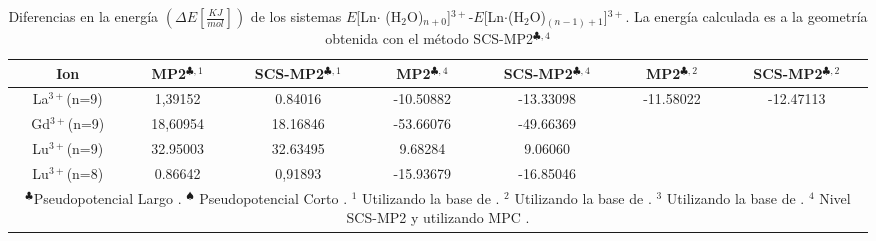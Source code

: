 \begin{table}[h!]
\centering
\caption{\footnotesize Diferencias en la energ\'ia $(\Delta E 
[\frac{KJ}{mol}])$ de los sistemas $E$[Ln$\cdot$
(H$_2$O)$_{n+0}$]$^{3+}$-$E$[Ln$\cdot$(H$_2$O)$_{(n-1)+1}$]$^{3+}$.
La energ\'ia calculada es a la geometr\'ia obtenida con el m\'etodo
SCS-MP2$^{\clubsuit,4}$}
\begin{tabular}{c|cccccc}\hline\hline
Ion & MP2$^{\clubsuit,1}$ & SCS-MP2$^{\clubsuit,1}$ & MP2$^{\clubsuit,4}$ &
SCS-MP2$^{\clubsuit,4}$ & MP2$^{\clubsuit,2}$ & SCS-MP2$^{\clubsuit,2}$ 
\\ \hline
La$^{3+}$(n=9) & 1,39152 & 0.84016 & -10.50882 & -13.33098 & -11.58022 & -12.47113  \\ 
Gd$^{3+}$(n=9) &18,60954 &18.16846 & -53.66076 & -49.66369  \\ 
Lu$^{3+}$(n=9) &32.95003 &32.63495 &   9.68284 &   9.06060  \\ 
Lu$^{3+}$(n=8) & 0.86642 & 0,91893 & -15.93679 & -16.85046  \\ 
\hline 
\multicolumn{7}{p{14.5cm}}{
{\footnotesize $^\clubsuit$Pseudopotencial Largo \citep{Dolg1989}. 
$^\spadesuit$ Pseudopotencial Corto \citep{Cao2001}}.
{\footnotesize $^1$ Utilizando la base de \cite{Dolg1993}.} 
{\footnotesize $^2$ Utilizando la base de \cite{Yang2005}.}
{\footnotesize $^3$ Utilizando la base de \cite{Cao2002}.}  
{\footnotesize $^4$ Nivel SCS-MP2 \citep{Grim2003} y utilizando MPC 
\citep{Toma2005}.}}
\end{tabular}\label{tSP}\end{table}
